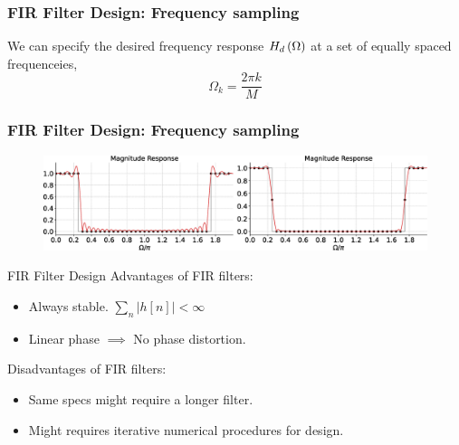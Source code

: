 \documentclass[aspectratio=169]{beamer}
\let\olditem\item
\renewcommand{\item}{\setlength{\itemsep}{\fill}\olditem}
\def\lp{\ensuremath\left(}
\def\rp{\ensuremath\right)}
\begin{document}
\begin{frame}[t]
  \frametitle{FIR Filter Design: Frequency sampling}

  We can specify the desired frequency response $H_d\lp \Omega \rp$ at a set of equally spaced frequenceies,
  \[ \Omega_k = \frac{2\pi k}{M}\] 
  
\end{frame}


\begin{frame}[t]
  \frametitle{FIR Filter Design: Frequency sampling}

  \begin{figure}
  \centering
  \includegraphics[width=1\textwidth]{img/firfreqsamp.eps}
  \end{figure}

\end{frame}






\begin{frame}{FIR Filter Design}
  Advantages of FIR filters:
  \begin{itemize}
    \item Always stable. $\sum_n \vert h[n] \vert < \infty$
    \item Linear phase $\implies$ No phase distortion.
  \end{itemize}
  \vspace{1cm}

  Disadvantages of FIR filters:
  \begin{itemize}
    \item Same specs might require a longer filter.
    \item Might requires iterative numerical procedures for design.
  \end{itemize}
  \vspace{1cm}
\end{frame}
\end{document}
